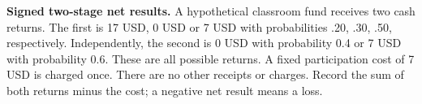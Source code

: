 \textbf{Signed two-stage net results.} A hypothetical classroom fund receives two cash returns. The first is
17 USD, 0 USD or 7 USD with probabilities .20, .30, .50, respectively. Independently, the second is 0 USD with
probability 0.4 or 7 USD with probability 0.6. These are all possible returns. A fixed participation cost of 7
USD is charged once. There are no other receipts or charges. Record the sum of both returns minus the cost; a
negative net result means a loss.

